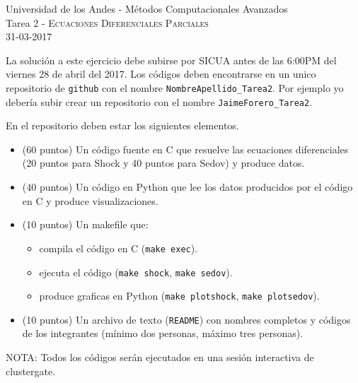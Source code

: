 \documentclass[11pt,letterpaper]{exam}
\begin{document}
\begin{center}
{\Large Universidad de los Andes - M\'etodos Computacionales Avanzados} \\
Tarea 2 - \textsc{Ecuaciones Diferenciales Parciales}\\
31-03-2017\\
\end{center}

\vspace{0.3cm}


\noindent
La soluci\'on a este ejercicio debe subirse por SICUA antes de las 6:00PM
del viernes 28 de abril del 2017. 
Los c\'odigos deben encontrarse en un unico repositorio de \verb'github'
con el nombre \verb"NombreApellido_Tarea2". Por ejemplo yo deber\'ia
subir crear un repositorio con el nombre \verb"JaimeForero_Tarea2". 

\noindent
En el repositorio deben estar los siguientes elementos.
\begin{itemize}
\item (60 puntos) Un c\'odigo fuente en C que resuelve
  las ecuaciones diferenciales (20 puntos para Shock y 40 puntos para
  Sedov) y produce datos.  
\item (40 puntos) Un c\'odigo en Python que lee los datos producidos por el
  c\'odigo en C y produce visualizaciones.
\item (10 puntos) Un makefile que:
\begin{itemize}
\item compila el c\'odigo en C (\verb"make exec").
\item ejecuta el c\'odigo (\verb"make shock", \verb"make sedov").
\item produce graficas en Python (\verb"make plotshock", \verb"make plotsedov").
\end{itemize}
\item (10 puntos) Un archivo de texto (\verb"README") con nombres completos y c\'odigos de los integrantes (m\'inimo dos personas, m\'aximo tres personas).
\end{itemize}
NOTA: Todos los c\'odigos ser\'an ejecutados en una sesi\'on
interactiva de clustergate.

\vspace{0.3cm}
\end{document}
